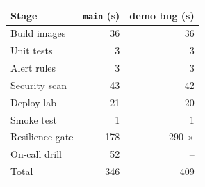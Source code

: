 \begin{tabular}{@{}lrr@{}}
\toprule
Stage & \texttt{main} (s) & demo bug (s) \\
\midrule
Build images & 36 & 36 \\
Unit tests & 3 & 3 \\
Alert rules & 3 & 3 \\
Security scan & 43 & 42 \\
Deploy lab & 21 & 20 \\
Smoke test & 1 & 1 \\
Resilience gate & 178 & 290 $\times$ \\
On-call drill & 52 & -- \\
\midrule
Total & 346 & 409 \\
\bottomrule
\end{tabular}